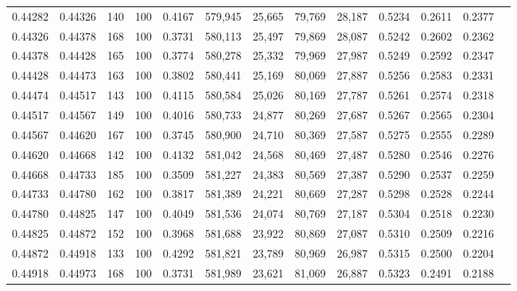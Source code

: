 \begin{tabular}{rrrrrrrrrrrrr}
0.44282 & 0.44326 &   140 & 100 &                                     0.4167 & 579,945 &  25,665 &  79,769 &  28,187 & 0.5234 & 0.2611 & 0.2377 \\
0.44326 & 0.44378 &   168 & 100 &                                     0.3731 & 580,113 &  25,497 &  79,869 &  28,087 & 0.5242 & 0.2602 & 0.2362 \\
0.44378 & 0.44428 &   165 & 100 &                                     0.3774 & 580,278 &  25,332 &  79,969 &  27,987 & 0.5249 & 0.2592 & 0.2347 \\
0.44428 & 0.44473 &   163 & 100 &                                     0.3802 & 580,441 &  25,169 &  80,069 &  27,887 & 0.5256 & 0.2583 & 0.2331 \\
0.44474 & 0.44517 &   143 & 100 &                                     0.4115 & 580,584 &  25,026 &  80,169 &  27,787 & 0.5261 & 0.2574 & 0.2318 \\
0.44517 & 0.44567 &   149 & 100 &                                     0.4016 & 580,733 &  24,877 &  80,269 &  27,687 & 0.5267 & 0.2565 & 0.2304 \\
0.44567 & 0.44620 &   167 & 100 &                                     0.3745 & 580,900 &  24,710 &  80,369 &  27,587 & 0.5275 & 0.2555 & 0.2289 \\
0.44620 & 0.44668 &   142 & 100 &                                     0.4132 & 581,042 &  24,568 &  80,469 &  27,487 & 0.5280 & 0.2546 & 0.2276 \\
0.44668 & 0.44733 &   185 & 100 &                                     0.3509 & 581,227 &  24,383 &  80,569 &  27,387 & 0.5290 & 0.2537 & 0.2259 \\
0.44733 & 0.44780 &   162 & 100 &                                     0.3817 & 581,389 &  24,221 &  80,669 &  27,287 & 0.5298 & 0.2528 & 0.2244 \\
0.44780 & 0.44825 &   147 & 100 &                                     0.4049 & 581,536 &  24,074 &  80,769 &  27,187 & 0.5304 & 0.2518 & 0.2230 \\
0.44825 & 0.44872 &   152 & 100 &                                     0.3968 & 581,688 &  23,922 &  80,869 &  27,087 & 0.5310 & 0.2509 & 0.2216 \\
0.44872 & 0.44918 &   133 & 100 &                                     0.4292 & 581,821 &  23,789 &  80,969 &  26,987 & 0.5315 & 0.2500 & 0.2204 \\
0.44918 & 0.44973 &   168 & 100 &                                     0.3731 & 581,989 &  23,621 &  81,069 &  26,887 & 0.5323 & 0.2491 & 0.2188 \\

\end{tabular}
